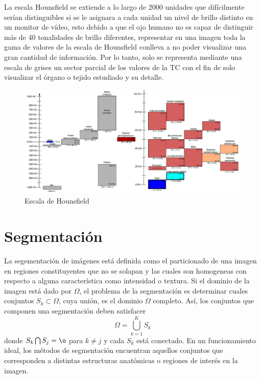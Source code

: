\documentclass[12pt]{report}
\begin{document}
La escala Hounsfield se extiende a lo largo de 2000 unidades que difícilmente serían distinguibles si se le asignara a cada unidad un nivel de brillo distinto en un monitor de vídeo, esto debido a que el ojo humano no es capaz de distinguir más de 40 tonalidades de brillo diferentes, representar en una imagen toda la gama de valores de la escala de Hounsfield conlleva a no poder visualizar una gran cantidad de información. Por lo tanto, solo se representa mediante una escala de grises un sector parcial de los valores de la TC con el fin de solo visualizar el órgano o tejido estudiado y su detalle.\cite{hounsdos}\\
\begin{figure}[H]
\centering
\includegraphics[width = 13 cm, height = 10 cm]{escala}
\caption{Escala de Hounsfield}
\end{figure}



\section{Segmentación}
La segementación de imágenes está definida como el particionado de una imagen en regiones constituyentes que no se solapan y las cuales son homogeneas con respecto a alguna característica como intensidad o textura. Si el dominio de la imagen está dado por $\Omega$, el problema de la segmentación es determinar cuales conjuntos $S_{k} \subset \Omega$, cuya unión, es el dominio $\Omega$ completo. Así, los conjuntos que componen una segmentación deben satisfacer \begin{equation} \Omega = \bigcup_{k = 1}^{K} S_{k} \end{equation}
donde $S_{k} \bigcap S_{j} = \o$ para $ k \neq j$ y cada $S_{k}$ está conectado. En un funcionamiento ideal, los métodos de segmentación encuentran aquellos conjuntos que corresponden a distintas estructuras anatómicas o regiones de interés en la imagen.\\
\end{document}
